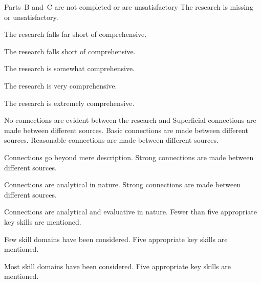 \documentclass{../../fal_assignment}
\begin{document}
\begin{markingrubric}
		\grade\fail Parts~B and~C are not completed or are unsatisfactory
        \grade \fail The research is missing or unsatisfactory.
        	\par 
        \grade The research falls far short of comprehensive.
        	\par 
        \grade The research falls short of comprehensive.
        	\par 
        \grade The research is somewhat comprehensive.
        	\par 
	\grade The research is very comprehensive.
        	\par 
	\grade The research is extremely comprehensive.
        	\par 
        \grade\fail No connections are evident between the research and 
        \grade		Superficial connections are made between different sources.
        \grade		Basic connections are made between different sources.
        \grade		Reasonable connections are made between different sources.
        \par		Connections go beyond mere description.
        \grade		Strong connections are made between different sources.
        \par		Connections are analytical in nature.
        \grade		Strong connections are made between different sources.
        \par		Connections are analytical and evaluative in nature.
        \grade \fail  	Fewer than five appropriate key skills are mentioned.
         \par 		Few skill domains have been considered.
        \grade 		Five appropriate key skills are mentioned.
        \par 		Most skill domains have been considered.
        \grade 		Five appropriate key skills are mentioned.

\end{markingrubric}
\end{document}
